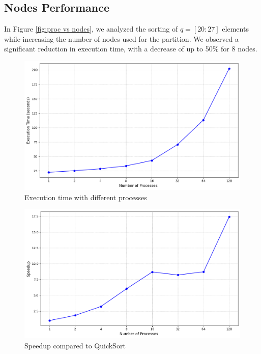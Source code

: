 \documentclass{article}
\begin{document}
\subsection{Nodes Performance}
In Figure \ref{fig:proc vs nodes}, we analyzed the sorting of $q = [20:27]$ elements while increasing the number of nodes used for the partition. We observed a significant reduction in execution time, with a decrease of up to 50\% for 8 nodes.

\begin{figure}[h!]
    \centering
    \includegraphics[width=1\linewidth]{assets/performance.png}
    \caption{Execution time with different processes}
    \label{fig:performance}
\end{figure}

\begin{figure}[h!]
    \centering
    \includegraphics[width=1\linewidth]{assets/speedup.png}
    \caption{Speedup compared to QuickSort }
    \label{fig:speedup}
\end{figure}
\end{document}
